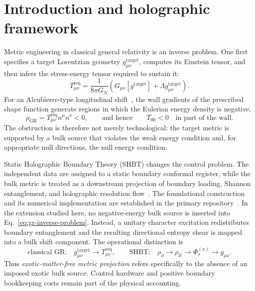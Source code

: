 \section{Introduction and holographic framework}\label{sec:introduction}

Metric engineering in classical general relativity is an inverse problem.  One first specifies a target Lorentzian geometry \(g_{\mu\nu}^{\mathrm{target}}\), computes its Einstein tensor, and then infers the stress-energy tensor required to sustain it:
\begin{equation}
  T_{\mu\nu}^{\mathrm{req}}
  =
  \frac{1}{8\pi G_N}
  \left(
    G_{\mu\nu}[g^{\mathrm{target}}]
    +\Lambda g_{\mu\nu}^{\mathrm{target}}
  \right).
  \label{eq:gr-inverse-problem}
\end{equation}
For an Alcubierre-type longitudinal shift~\cite{Alcubierre:1994}, the wall gradients of the prescribed shape function generate regions in which the Eulerian energy density is negative,
\begin{equation}
  \rho_{\mathrm{GR}}
  =
  T_{\mu\nu}^{\mathrm{req}}n^\mu n^\nu
  <0,
  \qquad\text{and hence}\qquad
  T_{00}<0
  \quad\text{in part of the wall}.
  \label{eq:classical-negative-energy}
\end{equation}
The obstruction is therefore not merely technological: the target metric is supported by a bulk source that violates the weak energy condition and, for appropriate null directions, the null energy condition.

Static Holographic Boundary Theory (SHBT) changes the control problem.  The independent data are assigned to a static boundary conformal register, while the bulk metric is treated as a downstream projection of boundary loading, Shannon entanglement, and holographic resolution flow~\cite{Maldacena:1998,tHooft:1993,Bekenstein:1981}.  The foundational construction and its numerical implementation are established in the primary repository~\cite{shbt-precision}.  In the extension studied here, no negative-energy bulk source is inserted into Eq.~\eqref{eq:gr-inverse-problem}.  Instead, a unitary character excitation redistributes boundary entanglement and the resulting directional entropy shear is mapped into a bulk shift component.  The operational distinction is
\begin{equation}
  \text{classical GR:}\quad
  g_{\mu\nu}^{\mathrm{target}}
  \longrightarrow T_{\mu\nu}^{\mathrm{req}},
  \qquad
  \text{SHBT:}\quad
  \rho_{\partial}
  \longrightarrow \rho_E
  \longrightarrow \Phi_s^{(x)}
  \longrightarrow g_{\mu\nu}.
  \label{eq:bulk-versus-boundary-control}
\end{equation}
Thus \emph{exotic-matter-free metric projection} refers specifically to the absence of an imposed exotic bulk source.  Control hardware and positive boundary bookkeeping costs remain part of the physical accounting.

